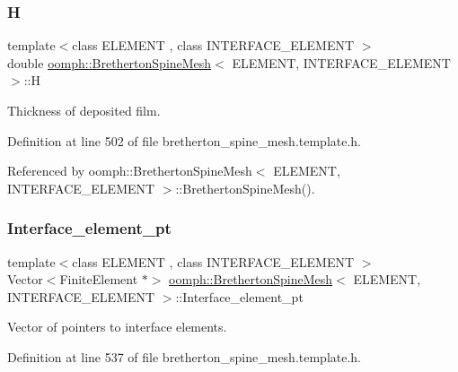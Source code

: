\subsubsection{\texorpdfstring{H}{H}}
{\footnotesize\ttfamily template$<$class E\+L\+E\+M\+E\+NT , class I\+N\+T\+E\+R\+F\+A\+C\+E\+\_\+\+E\+L\+E\+M\+E\+NT $>$ \\
double \hyperlink{classoomph_1_1BrethertonSpineMesh}{oomph\+::\+Bretherton\+Spine\+Mesh}$<$ E\+L\+E\+M\+E\+NT, I\+N\+T\+E\+R\+F\+A\+C\+E\+\_\+\+E\+L\+E\+M\+E\+NT $>$\+::H\hspace{0.3cm}{\ttfamily [protected]}}



Thickness of deposited film. 



Definition at line 502 of file bretherton\+\_\+spine\+\_\+mesh.\+template.\+h.



Referenced by oomph\+::\+Bretherton\+Spine\+Mesh$<$ E\+L\+E\+M\+E\+N\+T, I\+N\+T\+E\+R\+F\+A\+C\+E\+\_\+\+E\+L\+E\+M\+E\+N\+T $>$\+::\+Bretherton\+Spine\+Mesh().

\mbox{\label{classoomph_1_1BrethertonSpineMesh_a204c551bf8ac1a3a4ca4cd31c0db9c56}} 
\subsubsection{\texorpdfstring{Interface\+\_\+element\+\_\+pt}{Interface\_element\_pt}}
{\footnotesize\ttfamily template$<$class E\+L\+E\+M\+E\+NT , class I\+N\+T\+E\+R\+F\+A\+C\+E\+\_\+\+E\+L\+E\+M\+E\+NT $>$ \\
Vector$<$Finite\+Element $\ast$$>$ \hyperlink{classoomph_1_1BrethertonSpineMesh}{oomph\+::\+Bretherton\+Spine\+Mesh}$<$ E\+L\+E\+M\+E\+NT, I\+N\+T\+E\+R\+F\+A\+C\+E\+\_\+\+E\+L\+E\+M\+E\+NT $>$\+::Interface\+\_\+element\+\_\+pt\hspace{0.3cm}{\ttfamily [protected]}}



Vector of pointers to interface elements. 



Definition at line 537 of file bretherton\+\_\+spine\+\_\+mesh.\+template.\+h.



